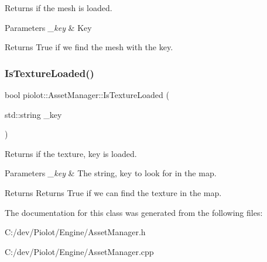 Returns if the mesh is loaded. 


\begin{DoxyParams}{Parameters}
{\em \+\_\+key} & Key \\
\hline
\end{DoxyParams}
\begin{DoxyReturn}{Returns}
True if we find the mesh with the key. 
\end{DoxyReturn}
\mbox{\label{classpiolot_1_1_asset_manager_acc9c8e5aff5c4b93faa151e0efb012f3}} 
\subsubsection{\texorpdfstring{Is\+Texture\+Loaded()}{IsTextureLoaded()}}
{\footnotesize\ttfamily bool piolot\+::\+Asset\+Manager\+::\+Is\+Texture\+Loaded (\begin{DoxyParamCaption}\item[{std\+::string}]{\+\_\+key }\end{DoxyParamCaption})\hspace{0.3cm}{\ttfamily [inline]}}



Returns if the texture, key is loaded. 


\begin{DoxyParams}{Parameters}
{\em \+\_\+key} & The string, key to look for in the map. \\
\hline
\end{DoxyParams}
\begin{DoxyReturn}{Returns}
Returns True if we can find the texture in the map. 
\end{DoxyReturn}


The documentation for this class was generated from the following files\+:\begin{DoxyCompactItemize}
\item 
C\+:/dev/\+Piolot/\+Engine/Asset\+Manager.\+h\item 
C\+:/dev/\+Piolot/\+Engine/Asset\+Manager.\+cpp\end{DoxyCompactItemize}
